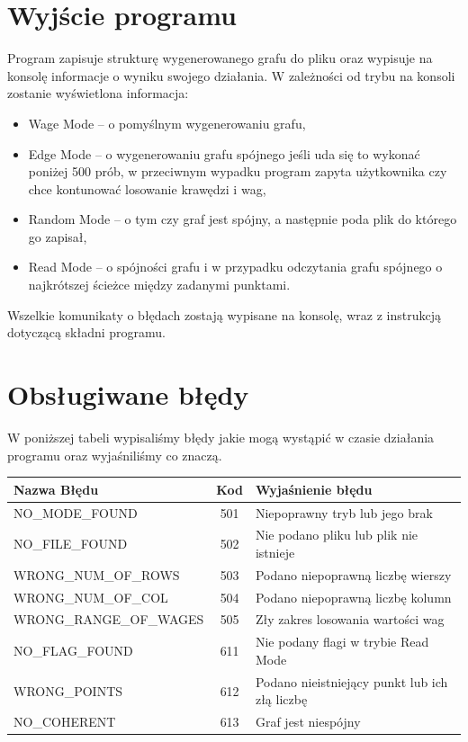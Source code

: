 \documentclass[10pt, a4paper]{report}
\begin{document}
\section{Wyjście programu}
Program zapisuje strukturę wygenerowanego grafu do pliku oraz wypisuje na konsolę informacje o wyniku swojego działania.
\newline W zależności od trybu na konsoli zostanie wyświetlona informacja:

\begin{itemize}
    \item Wage Mode -- o pomyślnym wygenerowaniu grafu,
    \item Edge Mode – o wygenerowaniu grafu spójnego jeśli uda się to wykonać poniżej 500 prób, w przeciwnym wypadku program zapyta użytkownika czy chce kontunować losowanie krawędzi i wag,
    \item Random Mode – o tym czy graf jest spójny, a następnie poda plik do którego go zapisał,
    \item Read Mode -- o spójności grafu i w przypadku odczytania grafu spójnego o najkrótszej ścieżce między zadanymi punktami.
\end{itemize}
Wszelkie komunikaty o błędach zostają wypisane na konsolę, wraz z instrukcją dotyczącą składni programu.

\section{Obsługiwane błędy}
W poniższej tabeli wypisaliśmy błędy jakie mogą wystąpić w czasie działania programu oraz wyjaśniliśmy co znaczą.

\begin{tabularx}{\textwidth}{ l|c|l } 
\hline Nazwa Błędu & Kod & Wyjaśnienie błędu\\ 
\hline NO\_MODE\_FOUND & 501 & Niepoprawny tryb lub jego brak\\ 
\hline NO\_FILE\_FOUND & 502 & Nie podano pliku lub plik nie istnieje\\ 
\hline WRONG\_NUM\_OF\_ROWS & 503 & Podano niepoprawną liczbę wierszy\\
\hline WRONG\_NUM\_OF\_COL & 504 & Podano niepoprawną liczbę kolumn\\
\hline WRONG\_RANGE\_OF\_WAGES & 505 & Zły zakres losowania wartości wag\\
\hline NO\_FLAG\_FOUND & 611 & Nie podany flagi w trybie Read Mode\\
\hline WRONG\_POINTS & 612 & Podano nieistniejący punkt lub ich złą liczbę\\
\hline NO\_COHERENT & 613 & Graf jest niespójny \\
\hline
\end{tabularx}
\end{document}
